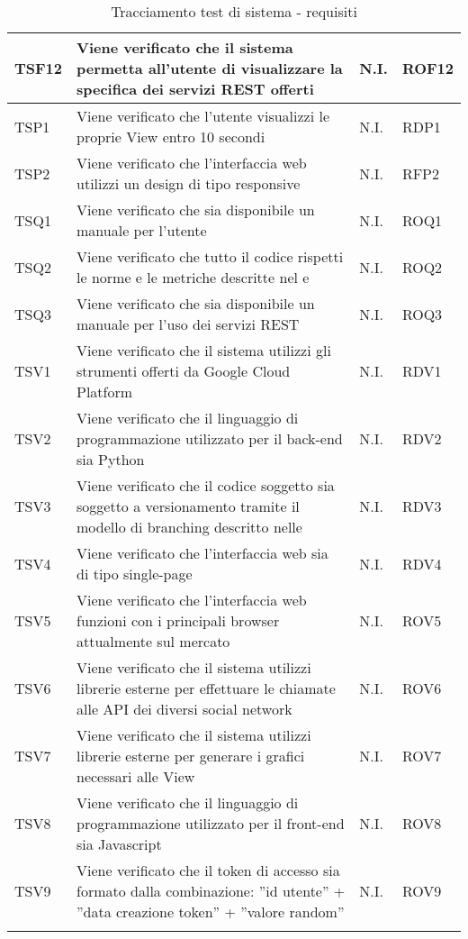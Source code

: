 \begin{center}
\begin{longtable}{| p{2cm} | p{7cm} | p{1.5cm} | p{2cm} |}
					\hline
					TSF12 & Viene verificato che il sistema permetta all'utente di visualizzare la specifica dei servizi REST offerti & N.I. & ROF12\\
					\hline
					TSP1 & Viene verificato che l'utente visualizzi le proprie View entro 10 secondi & N.I. & RDP1\\
					\hline
					TSP2 & Viene verificato che l'interfaccia web utilizzi un design di tipo responsive & N.I. & RFP2\\
					\hline
					TSQ1 & Viene verificato che sia disponibile un manuale per l'utente & N.I. & ROQ1\\
					\hline
					TSQ2 & Viene verificato che tutto il codice rispetti le norme e le metriche descritte nel \docNameVersionPdQ{} e \docNameVersionNdP & N.I. & ROQ2\\
					\hline
					TSQ3 & Viene verificato che sia disponibile un manuale per l'uso dei servizi REST & N.I. & ROQ3\\
					\hline
					TSV1 & Viene verificato che il sistema utilizzi gli strumenti offerti da Google Cloud Platform & N.I. & RDV1\\
					\hline
					TSV2 & Viene verificato che il linguaggio di programmazione utilizzato per il back-end sia Python & N.I. & RDV2\\
					\hline
					TSV3 & Viene verificato che il codice soggetto sia soggetto a versionamento tramite il modello di branching descritto nelle \docNameVersionNdP & N.I. & RDV3\\
					\hline
					TSV4 & Viene verificato che l'interfaccia web sia di tipo single-page & N.I. & RDV4\\
					\hline
					TSV5 & Viene verificato che l'interfaccia web funzioni con i principali browser attualmente sul mercato& N.I. & ROV5\\
					\hline
					TSV6 & Viene verificato che il sistema utilizzi librerie esterne per effettuare le chiamate alle API dei diversi social network & N.I. & ROV6\\
					\hline
					TSV7 & Viene verificato che il sistema utilizzi librerie esterne per generare i grafici necessari alle View & N.I. & ROV7\\
					\hline
					TSV8 & Viene verificato che il linguaggio di programmazione utilizzato per il front-end sia Javascript & N.I. & ROV8\\
					\hline
					TSV9 & Viene verificato che il token di accesso sia formato dalla combinazione: ''id utente'' + ''data creazione token'' + ''valore random'' & N.I. & ROV9\\
					\hline
			\caption{Tracciamento test di sistema - requisiti}
			\end{longtable}
				\egroup
\end{center}
		
